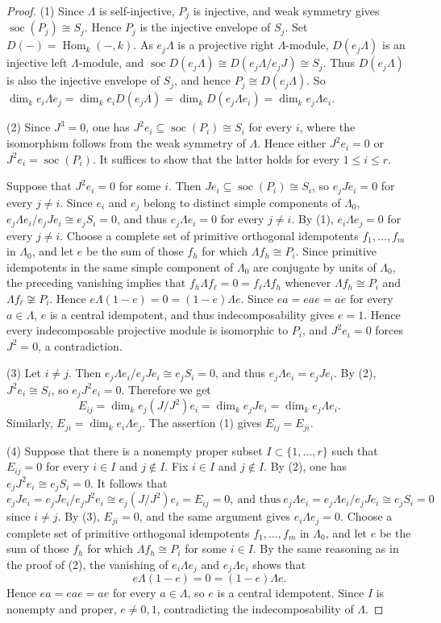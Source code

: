 \documentclass{amsart}
\theoremstyle{definition}
\theoremstyle{remark}
\numberwithin{equation}{thm}
\def\dim{\operatorname{dim}}
\def\Hom{\operatorname{Hom}}
\def\L{\Lambda}
\def\le{\leqslant}
\def\soc{\operatorname{soc}}
\begin{document}
\begin{proof}
(1) Since $\L$ is self-injective, $P_j$ is injective, and weak symmetry gives $\soc(P_j)\cong S_j$. Hence $P_j$ is the injective envelope of $S_j$.
Set $D(-)=\Hom_k(-,k)$. As $e_j\L$ is a projective right $\L$-module, $D(e_j\L)$ is an injective left $\L$-module, and $\soc D(e_j\L)\cong D(e_j\L/e_jJ)\cong S_j$.
Thus $D(e_j\L)$ is also the injective envelope of $S_j$, and hence $P_j\cong D(e_j\L)$.
So $\dim_k e_i\L e_j=\dim_k e_iD(e_j\L)=\dim_k D(e_j\L e_i)=\dim_k e_j\L e_i$.

(2) Since $J^3=0$, one has $J^2e_i\subseteq\soc(P_i)\cong S_i$ for every $i$, where the isomorphism follows from the weak symmetry of $\L$. Hence either $J^2e_i=0$ or $J^2e_i=\soc(P_i)$. 
It suffices to show that the latter holds for every $1\le i\le r$.

Suppose that $J^2e_i=0$ for some $i$. Then $Je_i\subseteq\soc(P_i)\cong S_i$, so $e_jJe_i=0$ for every $j\ne i$. 
Since $e_i$ and $e_j$ belong to distinct simple components of $\L_0$, $e_j\L e_i/e_jJe_i\cong e_jS_i=0$, and thus $e_j\L e_i=0$ for every $j\ne i$. 
By (1), $e_i\L e_j=0$ for every $j\ne i$. 
Choose a complete set of primitive orthogonal idempotents $f_1,\ldots,f_m$ in $\L_0$, and let $e$ be the sum of those $f_h$ for which $\L f_h\cong P_i$. Since primitive idempotents in the same simple component of $\L_0$ are conjugate by units of $\L_0$, the preceding vanishing implies that $f_h\L f_\ell=0=f_\ell\L f_h$ whenever $\L f_h\cong P_i$ and $\L f_\ell\not\cong P_i$. Hence $e\L(1-e)=0=(1-e)\L e$. Since $ea=eae=ae$ for every $a\in\L$, $e$ is a central idempotent, and thus indecomposability gives $e=1$. Hence every indecomposable projective module is isomorphic to $P_i$, and $J^2e_i=0$ forces $J^2=0$, a contradiction.

(3) Let $i\ne j$. Then $e_j\L e_i/e_jJe_i\cong e_jS_i=0$, and thus $e_j\L e_i=e_jJe_i$. By (2), $J^2e_i\cong S_i$, so $e_jJ^2e_i=0$. Therefore we get
$$
E_{ij}=\dim_k e_j(J/J^2)e_i=\dim_k e_jJe_i=\dim_k e_j\L e_i.
$$
Similarly, $E_{ji}=\dim_k e_i\L e_j$. The assertion (1) gives $E_{ij}=E_{ji}$.

(4) Suppose that there is a nonempty proper subset $I\subset\{1,\ldots,r\}$ such that $E_{ij}=0$ for every $i\in I$ and $j\notin I$. Fix $i\in I$ and $j\notin I$. By (2), one has $e_jJ^2e_i\cong e_jS_i=0$. It follows that
$$
e_jJe_i=e_jJe_i/e_jJ^2e_i\cong e_j(J/J^2)e_i=E_{ij}=0, \ \text{and thus}\ 
e_j\L e_i=e_j\L e_i/e_jJ e_i\cong e_jS_i=0
$$
since $i\ne j$.
By (3), $E_{ji}=0$, and the same argument gives $e_i\L e_j=0$. 
Choose a complete set of primitive orthogonal idempotents $f_1,\ldots,f_m$ in $\L_0$, and let $e$ be the sum of those $f_h$ for which $\L f_h\cong P_i$ for some $i\in I$. By the same reasoning as in the proof of (2), the vanishing of  $e_i\L e_j$ and $e_j\L e_i$ shows that
$$
e\L(1-e)=0=(1-e)\L e.
$$
Hence $ea=eae=ae$ for every $a\in\L$, so $e$ is a central idempotent.
Since $I$ is nonempty and proper, $e\ne0,1$, contradicting the
indecomposability of $\L$.
\end{proof}
\end{document}
